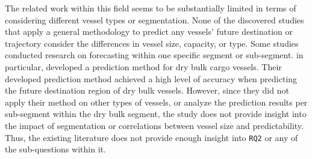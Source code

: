 
The related work within this field seems to be substantially limited in terms of considering different vessel types or segmentation. None of the discovered studies that apply a general methodology to predict any vessels' future destination or trajectory consider the differences in vessel size, capacity, or type. Some studies conducted research on forecasting within one specific segment or sub-segment. \cite{lechtenberg2019} in particular, developed a prediction method for dry bulk cargo vessels. Their developed prediction method achieved a high level of accuracy when predicting the future destination region of dry bulk vessels. However, since they did not apply their method on other types of vessels, or analyze the prediction results per sub-segment within the dry bulk segment, the study does not provide insight into the impact of segmentation or correlations between vessel size and predictability. Thus, the existing literature does not provide enough insight into \texttt{RQ2} or any of the sub-questions within it.




